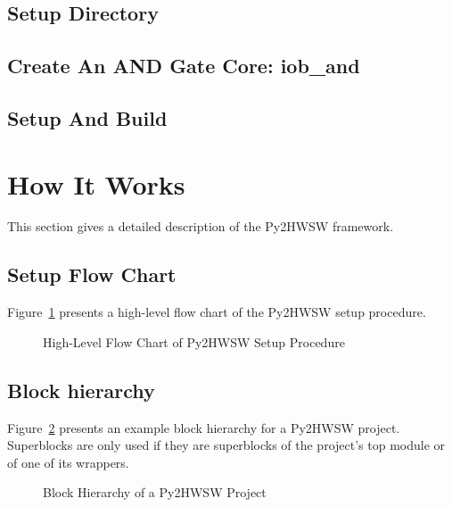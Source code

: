 \documentclass{ug}
\begin{document}
\subsection{Setup Directory}
\label{sec:setup_dir}


\subsection{Create An AND Gate Core: iob\_and}
\label{sec:iob_and}


\subsection{Setup And Build}
\label{sec:setup_build}


%
%
\ifdefined\SECTIONCLEARPAGE
\clearpage
\fi
\section{How It Works}
\label{sec:how_it_works}

This section gives a detailed description of the Py2HWSW framework.

\subsection{Setup Flow Chart}
\label{sec:py2_flow_chart}

Figure~\ref{fig:py2_flow_chart} presents a high-level flow chart of the Py2HWSW setup procedure.

\begin{figure}[H]
  \vspace{-0.7cm}
  \caption{High-Level Flow Chart of Py2HWSW Setup Procedure}
  \label{fig:py2_flow_chart}
\end{figure}

\subsection{Block hierarchy}
\label{sec:py2_block_hierarchy}

Figure~\ref{fig:py2_superblocks_subblocks} presents an example block hierarchy for a Py2HWSW project.
Superblocks are only used if they are superblocks of the project's top module or of one of its wrappers.

\begin{figure}[H]
  \vspace{-0.7cm}
  \caption{Block Hierarchy of a Py2HWSW Project}
  \label{fig:py2_superblocks_subblocks}
\end{figure}
\end{document}
